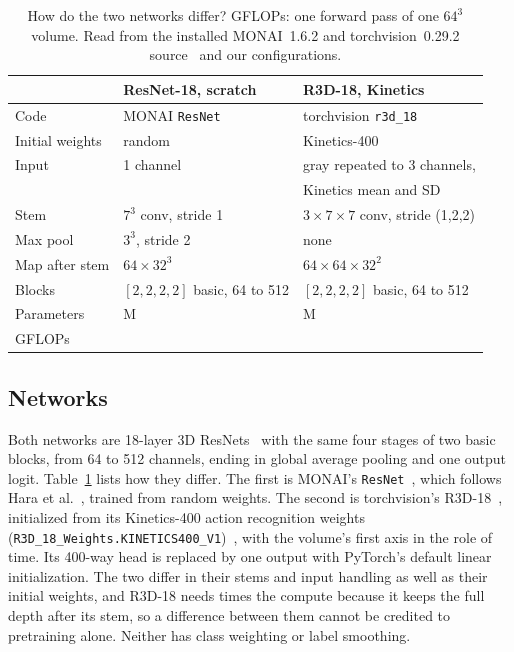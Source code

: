\documentclass[conference]{IEEEtran}
\newif\ifanycitation
\let\citeAnyKey\cite
\renewcommand{\cite}{\global\anycitationtrue\citeAnyKey}
\begin{document}
\begin{table}[t]
\caption{How do the two networks differ? GFLOPs: one forward pass of one $64^3$ volume. Read from the installed MONAI~1.6.2 and
torchvision~0.29.2 source~\cite{monai162resnet,torchvision029video} and our configurations.}
\label{tab:setup}
\centering
\footnotesize
\setlength{\tabcolsep}{3pt}
\begin{tabular}{@{}lll@{}}
\toprule
& ResNet-18, scratch & R3D-18, Kinetics \\
\midrule
Code & MONAI \texttt{ResNet} & torchvision \texttt{r3d\_18} \\
Initial weights & random & Kinetics-400 \\
Input & 1 channel & gray repeated to 3 channels, \\
& & Kinetics mean and SD \\
Stem & $7^3$ conv, stride 1 & $3{\times}7{\times}7$ conv, stride (1,2,2) \\
Max pool & $3^3$, stride 2 & none \\
Map after stem & $64{\times}32^3$ & $64{\times}64{\times}32^2$ \\
Blocks & $[2,2,2,2]$ basic, 64 to 512 & $[2,2,2,2]$ basic, 64 to 512 \\
Parameters & \paramsScratch{} M & \paramsKinetics{} M \\
GFLOPs & \gflopsScratch{} & \gflopsKinetics{} \\
\bottomrule
\end{tabular}
\end{table}

\subsection{Networks}

Both networks are 18-layer 3D ResNets~\cite{he2016deep} with the same four stages of two
basic blocks, from 64 to 512 channels, ending in global average pooling and one output
logit. Table~\ref{tab:setup} lists how they differ. The first is MONAI's
\texttt{ResNet}~\cite{cardoso2022monai}, which follows Hara et al.~\cite{hara2018can},
trained from random weights. The second is torchvision's R3D-18~\cite{tran2018closer},
initialized from its Kinetics-400 action recognition weights
(\texttt{R3D\_18\_Weights.KINETICS400\_V1})~\cite{kay2017kinetics}, with
the volume's first axis in the role of time. Its 400-way head is
replaced by one output with PyTorch's default linear initialization. The
two differ in their stems and input handling as well as their initial weights, and R3D-18 needs \gflopsRatio{} times the
compute because it keeps the full depth after its stem, so a difference between them cannot
be credited to pretraining alone. Neither has class weighting or label smoothing.
\end{document}
